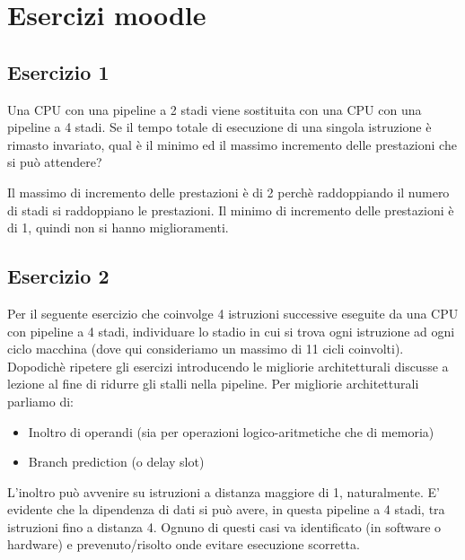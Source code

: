 \documentclass[a4paper]{article}
\theoremstyle{break}
\theoremstyle{break}
\theoremstyle{break}
\theoremstyle{break}
\begin{document}
\section{Esercizi moodle}
\subsection{Esercizio 1}
Una CPU con una pipeline a 2 stadi viene sostituita con una CPU con una pipeline a 4 stadi.
Se il tempo totale di esecuzione di una singola istruzione è rimasto invariato, qual è il minimo ed il massimo incremento delle prestazioni che si può attendere?

\vspace{1em}
\noindent Il massimo di incremento delle prestazioni è di 2 perchè raddoppiando il numero
di stadi si raddoppiano le prestazioni. Il minimo di incremento delle prestazioni è di 1,
quindi non si hanno miglioramenti.

\subsection{Esercizio 2}

Per il seguente esercizio che coinvolge 4 istruzioni successive eseguite da una CPU con pipeline a 4 stadi, individuare lo stadio in cui si trova ogni istruzione ad ogni ciclo macchina (dove qui consideriamo un massimo di 11 cicli coinvolti).
Dopodichè ripetere gli esercizi introducendo le migliorie architetturali discusse a lezione al fine di ridurre gli stalli nella pipeline.
Per migliorie architetturali parliamo di:

\begin{itemize}
  \item 
    Inoltro di operandi (sia per operazioni logico-aritmetiche che di memoria)
  \item 
    Branch prediction (o delay slot)
\end{itemize}


\noindent L'inoltro può avvenire su istruzioni a distanza maggiore di 1, naturalmente. E' evidente che la dipendenza di dati si può avere, in questa pipeline a 4 stadi, tra istruzioni fino a distanza 4.
Ognuno di questi casi va identificato (in software o hardware) e prevenuto/risolto onde evitare esecuzione scorretta.
\end{document}
